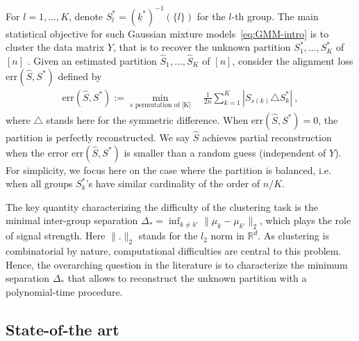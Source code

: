 \documentclass{article}
\begin{document}
For $l=1,\ldots, K$, denote $S^*_l= (\underline{k}^{*})^{-1}(\{l\})$ for the $l$-th group. The main statistical objective for such Gaussian mixture models~\eqref{eq:GMM-intro} is to cluster the data matrix $Y$, that is to recover the unknown partition 
$S^*_1,\ldots, S^*_K$ of $[n]$%
. Given an estimated partition $\hat{S}_1,\ldots, \hat{S}_K$ of $[n]$, consider the alignment  loss $\mathrm{err}(\hat{S}, S^*)$ defined by 
 \begin{align}\label{eq:definition_loss}
 \mathrm{err}(\hat{S}, S^*):= \min_{s \text{ permutation of [K]} }\quad  \frac{1}{2n}\sum_{k=1}^K |S_{s(k)}\triangle S^*_k|\ , 
 \end{align}
where  $\triangle$ stands here for the symmetric difference. When $\mathrm{err}(\hat{S},S^*)=0$, the partition is perfectly reconstructed. We say $\hat{S}$ achieves partial reconstruction when the error $\mathrm{err}(\hat{S}, S^*)$ is smaller than a random guess (independent of $Y$). For simplicity, we focus here on the case where the partition is balanced, i.e. when all groups  $S^*_k$'s have similar cardinality of the order of $n/K$. 






The key quantity characterizing the difficulty of the clustering task is the minimal inter-group separation $\Delta_* = \inf_{k\neq k'}\|\mu_k - \mu_{k'}\|_2$, which plays the role of signal strength. Here $\|.\|_2$ stands for the $l_2$ norm in $\mathbb{R}^d$. As clustering  is combinatorial by nature, computational difficulties are central to this problem. Hence, the overarching question in the literature is to characterize the minimum separation $\Delta_*$ that allows to reconstruct the unknown partition with a polynomial-time procedure. 


\subsection{State-of-the art}
\end{document}

